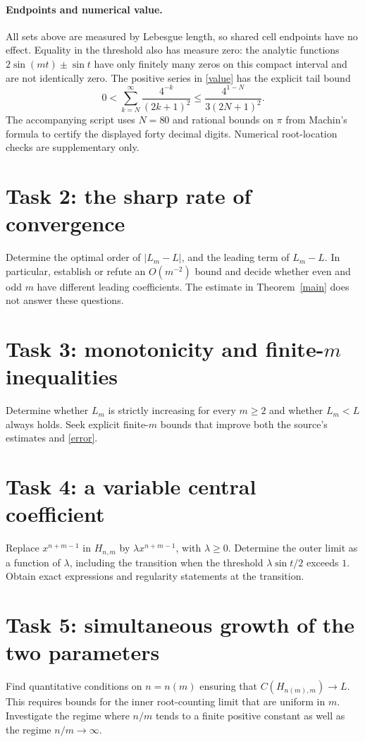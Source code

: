 \documentclass[11pt]{article}
\begin{document}
\paragraph{Endpoints and numerical value.}
All sets above are measured by Lebesgue length, so shared cell
endpoints have no effect. Equality in the threshold also has
measure zero: the analytic functions $2\sin(mt)\pm\sin t$ have
only finitely many zeros on this compact interval and are not
identically zero. The positive series in \eqref{value} has the
explicit tail bound
\[
 0<\sum_{k=N}^{\infty}\frac{4^{-k}}{(2k+1)^2}
 \leq\frac{4^{1-N}}{3(2N+1)^2}.
\]
The accompanying script uses $N=80$ and rational bounds on $\pi$
from Machin's formula to certify the displayed forty decimal
digits. Numerical root-location checks are supplementary only.

\section*{Task 2: the sharp rate of convergence}
Determine the optimal order of $|L_m-L|$, and the leading term
of $L_m-L$. In particular, establish or refute an $O(m^{-2})$
bound and decide whether even and odd $m$ have different leading
coefficients. The estimate in Theorem~\ref{main} does not answer
these questions.

\section*{Task 3: monotonicity and finite-$m$ inequalities}
Determine whether $L_m$ is strictly increasing for every $m\geq2$
and whether $L_m<L$ always holds. Seek explicit finite-$m$ bounds
that improve both the source's estimates and \eqref{error}.

\section*{Task 4: a variable central coefficient}
Replace $x^{n+m-1}$ in $H_{n,m}$ by $\lambda x^{n+m-1}$, with
$\lambda\geq0$. Determine the outer limit as a function of
$\lambda$, including the transition when the threshold
$\lambda\sin t/2$ exceeds $1$. Obtain exact expressions and
regularity statements at the transition.

\section*{Task 5: simultaneous growth of the two parameters}
Find quantitative conditions on $n=n(m)$ ensuring that
$C(H_{n(m),m})\to L$. This requires bounds for the inner
root-counting limit that are uniform in $m$. Investigate the
regime where $n/m$ tends to a finite positive constant as well
as the regime $n/m\to\infty$.
\end{document}
